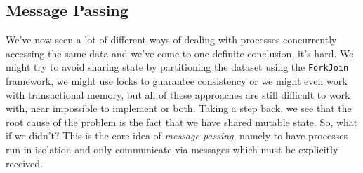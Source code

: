 \documentclass[main]{subfiles}
\begin{document}
\newpage

\subsection{Message Passing}
We've now seen a lot of different ways of dealing with processes concurrently accessing the same data and we've come to one definite conclusion, it's hard. We might try to avoid sharing state by partitioning the dataset using the \texttt{ForkJoin} framework, we might use locks to guarantee consistency or we might even work with transactional memory, but all of these approaches are still difficult to work with, near impossible to implement or both. Taking a step back, we see that the root cause of the problem is the fact that we have shared mutable state. So, what if we didn't? This is the core idea of \textit{message passing}, namely to have processes run in isolation and only communicate via messages which must be explicitly received.
\end{document}

